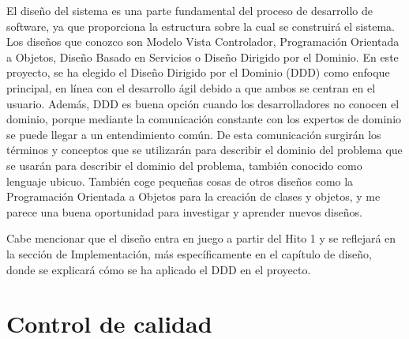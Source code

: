 El diseño del sistema es una parte fundamental del proceso de desarrollo de software, ya que proporciona la estructura sobre la cual se construirá el sistema.
Los diseños que conozco son Modelo Vista Controlador, Programación Orientada a Objetos, Diseño Basado en Servicios o Diseño Dirigido por el Dominio.
En este proyecto, se ha elegido el Diseño Dirigido por el Dominio (DDD) \cite{domain-drive-design} como enfoque principal, en línea con el desarrollo ágil debido a que ambos se centran en el usuario.
Además, DDD es buena opción cuando los desarrolladores no conocen el dominio, porque mediante la comunicación constante con los expertos de dominio se puede llegar a un entendimiento común.
De esta comunicación surgirán los términos y conceptos que se utilizarán para describir el dominio del problema que se usarán para describir el dominio del problema, también conocido como lenguaje ubicuo.
También coge pequeñas cosas de otros diseños como la Programación Orientada a Objetos para la creación de clases y objetos, y me parece una buena oportunidad para investigar y aprender nuevos diseños.

Cabe mencionar que el diseño entra en juego a partir del Hito 1 y se reflejará en la sección de Implementación,
más específicamente en el capítulo de diseño, donde se explicará cómo se ha aplicado el DDD en el proyecto.

\section{Control de calidad}


